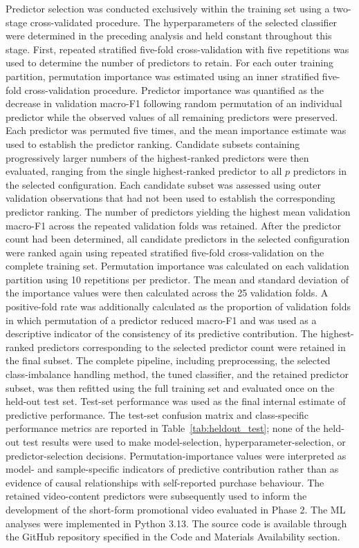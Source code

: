 \documentclass[jtaer,article,submit,moreauthors]{Definitions/mdpi}
\begin{document}
Predictor selection was conducted exclusively within the training set
using a two-stage cross-validated procedure. The hyperparameters of the
selected classifier were determined in the preceding analysis and held
constant throughout this stage.
First, repeated stratified five-fold cross-validation with five
repetitions was used to determine the number of predictors to retain.
For each outer training partition, permutation importance was estimated
using an inner stratified five-fold cross-validation procedure.
Predictor importance was quantified as the decrease in validation
macro-F1 following random permutation of an individual predictor while
the observed values of all remaining predictors were preserved. Each
predictor was permuted five times, and the mean importance estimate was
used to establish the predictor ranking.
Candidate subsets containing progressively larger numbers of the
highest-ranked predictors were then evaluated, ranging from the single
highest-ranked predictor to all \(p\) predictors in the selected
configuration. Each candidate subset was assessed using outer
validation observations that had not been used to establish the
corresponding predictor ranking. The number of predictors yielding the
highest mean validation macro-F1 across the repeated validation folds
was retained.
After the predictor count had been determined, all candidate predictors
in the selected configuration were ranked again using repeated
stratified five-fold cross-validation on the complete training set.
Permutation importance was calculated on each validation partition
using 10 repetitions per predictor. The mean and standard deviation of
the importance values were then calculated across the 25 validation
folds. A positive-fold rate was additionally calculated as the
proportion of validation folds in which permutation of a predictor
reduced macro-F1 and was used as a descriptive indicator of the
consistency of its predictive contribution.
The highest-ranked predictors corresponding to the selected predictor
count were retained in the final subset. The complete pipeline,
including preprocessing, the selected class-imbalance handling method,
the tuned classifier, and the retained predictor subset, was then
refitted using the full training set and evaluated once on the held-out
test set. Test-set performance was used as the final internal estimate
of predictive performance. The test-set confusion matrix and
class-specific performance metrics are reported in
Table~\ref{tab:heldout_test}; none of the held-out test results were
used to make model-selection, hyperparameter-selection, or
predictor-selection decisions.
Permutation-importance values were interpreted as model- and
sample-specific indicators of predictive contribution rather than as
evidence of causal relationships with self-reported purchase behaviour.
The retained video-content predictors were subsequently used to inform
the development of the short-form promotional video evaluated in
Phase 2.
The ML analyses were implemented in Python 3.13. The source code is
available through the GitHub repository specified in the Code and
Materials Availability section.
\end{document}
